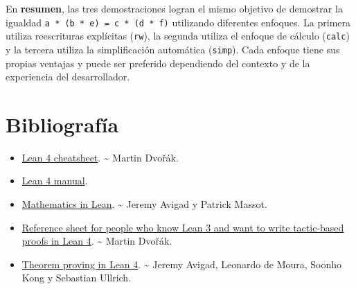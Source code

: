 En \textbf{resumen}, las tres demostraciones logran el mismo objetivo de
demostrar la igualdad \texttt{a * (b * e) = c * (d * f)} utilizando diferentes
enfoques. La primera utiliza reescrituras explícitas (\texttt{rw}), la segunda
utiliza el enfoque de cálculo (\texttt{calc}) y la tercera utiliza la
simplificación automática (\texttt{simp}). Cada enfoque tiene sus propias
ventajas y puede ser preferido dependiendo del contexto y de la
experiencia del desarrollador.

\chapter{Bibliografía}
\label{sec:org630500b}

\begin{itemize}
\item \href{https://raw.githubusercontent.com/madvorak/lean4-cheatsheet/main/lean-tactics.pdf}{Lean 4 cheatsheet}. \textasciitilde{} Martin Dvořák.
\item \href{https://leanprover.github.io/lean4/doc/whatIsLean.html}{Lean 4 manual}.
\item \href{https://leanprover-community.github.io/mathematics\_in\_lean/mathematics\_in\_lean.pdf}{Mathematics in Lean}. \textasciitilde{} Jeremy Avigad y Patrick Massot.
\item \href{https://github.com/madvorak/lean3-tactic-lean4/blob/main/README.md}{Reference sheet for people who know Lean 3 and want to write tactic-based proofs in Lean 4}. \textasciitilde{} Martin Dvořák.
\item \href{https://leanprover.github.io/theorem\_proving\_in\_lean4/title\_page.html}{Theorem proving in Lean 4}. \textasciitilde{} Jeremy Avigad, Leonardo de Moura, Soonho
Kong y Sebastian Ullrich.
\end{itemize}


